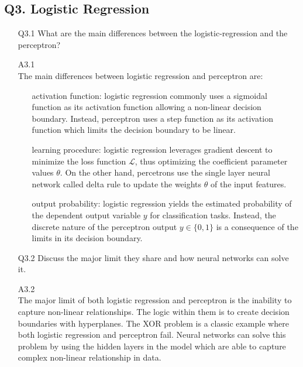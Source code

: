 \documentclass[unicode, 11pt, a4paper]{scrartcl}
\begin{document}
\subsection*{Q3. Logistic Regression}
\begin{itemize}
	\item[Q3.1] What are the main differences between the logistic-regression and the perceptron?

	\item[A3.1] ~\\
	      The main differences between logistic regression and perceptron are:
	      \begin{itemize}
		      \item[] activation function:
		            logistic regression commonly uses a sigmoidal function as its activation function
		            allowing a non-linear decision boundary.
		            Instead, perceptron uses a step function as its activation function which
		            limits the decision boundary to be linear.

		      \item[] learning procedure:
		            logistic regression leverages gradient descent to minimize the loss function
		            $\mathcal{L}$, thus optimizing the coefficient parameter values $\theta$.
		            On the other hand, percetrons use the single layer neural network called
		            delta rule to update the weights $\theta$ of the input features.

		      \item[] output probability:
		            logistic regression yields the estimated probability of the dependent output variable
		            $y$ for classification tasks.
		            Instead, the discrete nature of the perceptron output $y \in \{ 0, 1 \}$
		            is a consequence of the limits in its decision boundary.
	      \end{itemize}

	\item[Q3.2] Discuss the major limit they share and how neural networks can solve it.

	\item[A3.2] ~\\
	      The major limit of both logistic regression and perceptron is the inability
	      to capture non-linear relationships.
	      The logic within them is to create decision boundaries with hyperplanes.
	      The XOR problem is a classic example where both logistic regression and perceptron fail.
	      Neural networks can solve this problem by using the hidden layers in the model
	      which are able to capture complex non-linear relationship in data.


\end{itemize}
\end{document}
